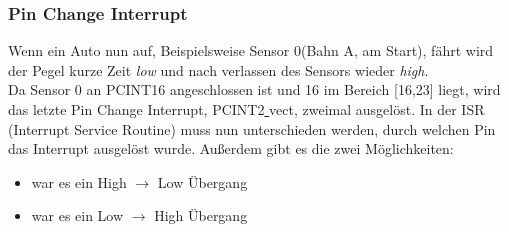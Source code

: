 \documentclass[a4paper, 11pt]{report}
\begin{document}
			\subsubsection {Pin Change Interrupt}\label{subsubsec:PCINT}
			Wenn ein Auto nun auf, Beispielsweise Sensor 0(Bahn A, am Start), fährt wird der Pegel kurze Zeit \emph{low} und nach verlassen des Sensors wieder \emph{high}.\\ Da Sensor 0 an PCINT16 angeschlossen ist und 16 im Bereich [16,23] liegt, wird das letzte Pin Change Interrupt, PCINT2\underline{ }vect, zweimal ausgelöst. In der ISR (Interrupt Service Routine) muss nun unterschieden werden, durch welchen Pin das Interrupt ausgelöst wurde.
			Außerdem gibt es die zwei Möglichkeiten:
				\begin{itemize}
					\item war es ein High $\rightarrow$ Low Übergang
					\item war es ein Low $\rightarrow$ High Übergang
				\end{itemize}
\end{document}

